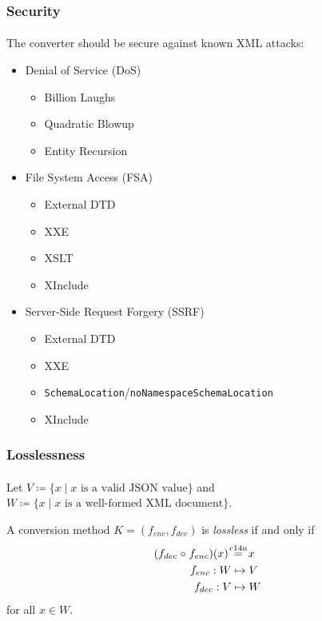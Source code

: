 \documentclass[
    alternativetitlepage=alternativ,
    cornerlogo=hgi_nds_logo2,
    sectionoverview,
]{rubpresentation}
\begin{document}
\begin{frame}
  \frametitle{Security}
  \framesubtitle{}
  The converter should be secure against known XML attacks:
  \begin{itemize}
    \item{} Denial of Service (DoS)
      \begin{itemize}
        \item{Billion Laughs}
        \item{Quadratic Blowup}
        \item{Entity Recursion}
      \end{itemize}
    \item{} File System Access (FSA)
      \begin{itemize}
        \item{External DTD}
        \item{XXE}
        \item{XSLT}
        \item{XInclude}
      \end{itemize}
    \item{} Server-Side Request Forgery (SSRF)
      \begin{itemize}
        \item{External DTD}
        \item{XXE}
        \item{\texttt{SchemaLocation}/\texttt{noNamespaceSchemaLocation}}
        \item{XInclude}
      \end{itemize}
  \end{itemize}
\end{frame}

\begin{frame}
  \frametitle{Losslessness}
  \framesubtitle{}
  \begin{definition}
      Let $V \coloneqq \{x \mid x\text{ is a valid } \text{JSON value}\}$ and $W \coloneqq \{x \mid x\text{ is a well-formed XML document}\}$.

      A conversion method $K = (f_{enc}, f_{dec})$ is \emph{lossless} if and only if
      \begin{align}
          (f_{dec}\mathrel{\circ} f_{enc})(x) \; &\mathbin{\stackrel{\mathmakebox[\widthof{=}]{\mathrm{c14n}}}{=}} \; x\\
          f_{enc}: W &\mapsto V\\
          f_{dec}: V &\mapsto W
      \end{align}
      for all $x \in W$.
  \end{definition}
\end{frame}
\end{document}
